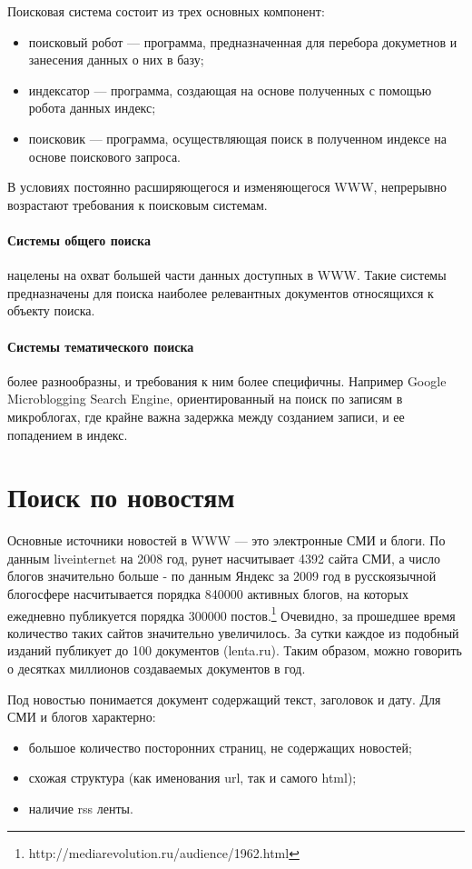 Поисковая система состоит из трех основных компонент: 
\begin{itemize}
 \item поисковый робот --- программа, предназначенная для перебора докуметнов и
занесения данных о них в базу;
 \item индексатор --- программа, создающая на основе полученных с помощью робота данных индекс;
 \item поисковик --- программа, осуществляющая поиск в полученном индексе на основе поискового запроса.
\end{itemize} В условиях постоянно расширяющегося и изменяющегося WWW, непрерывно
возрастают требования к поисковым системам. 

\paragraph{Системы общего поиска} нацелены на охват большей части данных
доступных в WWW. Такие системы предназначены для поиска наиболее релевантных
документов относящихся к объекту поиска. 
\paragraph{Системы тематического поиска} более разнообразны, и требования к ним более специфичны.
 Например Google Microblogging Search Engine, ориентированный на поиск по записям в микроблогах,
где крайне важна задержка между созданием записи, и ее попадением в индекс.

\section{Поиск по новостям}

Основные источники новостей в WWW --- это электронные СМИ и блоги. По данным
liveinternet на 2008 год, рунет насчитывает 4392 сайта СМИ,
 а число блогов значительно больше - по данным Яндекс за 2009 год в русскоязычной блогосфере насчитывается порядка 840000 активных блогов, 
на которых ежедневно публикуется порядка 300000 постов.\footnote{http://mediarevolution.ru/audience/1962.html}
Очевидно, за прошедшее время количество таких сайтов значительно увеличилось. За сутки каждое
из подобный изданий публикует до 100 документов (lenta.ru). Таким образом, 
можно говорить о десятках миллионов создаваемых документов в год.

Под новостью понимается документ содержащий текст, заголовок и дату. Для СМИ и
блогов характерно:
\begin{itemize} 
 \item большое количество посторонних страниц, не содержащих новостей;
 \item схожая структура (как именования url, так и самого html);
 \item наличие rss ленты.
\end{itemize}


